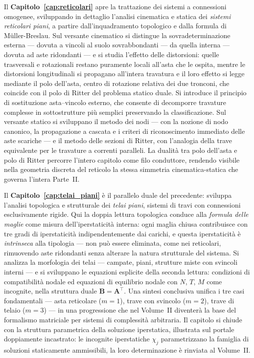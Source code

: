 Il \textbf{Capitolo~\ref{cap:reticolari}} apre la trattazione dei sistemi a connessioni
omogenee, sviluppando in dettaglio l'analisi cinematica e statica dei \emph{sistemi
	reticolari piani}, a partire dall'inquadramento topologico e dalla formula di
Müller-Breslau. Sul versante cinematico si distingue la sovradeterminazione esterna --- dovuta a vincoli al suolo
sovrabbondanti --- da quella interna --- dovuta ad aste ridondanti --- e si studia
l'effetto delle distorsioni: quelle trasversali e rotazionali restano puramente locali
all'asta che le ospita, mentre le distorsioni longitudinali si propagano all'intera
travatura e il loro effetto si legge mediante il polo dell'asta, centro di rotazione
relativa dei due tronconi, che coincide con il polo di Ritter del problema statico
duale. Si introduce il principio di sostituzione asta--vincolo esterno, che consente
di decomporre travature complesse in sottostrutture più semplici preservando la
classificazione. Sul versante statico si sviluppano il metodo dei nodi --- con la
nozione di nodo canonico, la propagazione a cascata e i criteri di riconoscimento
immediato delle aste scariche --- e il metodo delle sezioni di Ritter, con l'analogia
della trave equivalente per le travature a correnti paralleli. La dualità tra polo
dell'asta e polo di Ritter percorre l'intero capitolo come filo conduttore, rendendo
visibile nella geometria discreta del reticolo la stessa simmetria cinematica-statica
che governa l'intera Parte~II.

Il \textbf{Capitolo~\ref{cap:telai_piani}} è il parallelo duale del precedente:
sviluppa l'analisi topologica e strutturale dei \emph{telai piani}, sistemi di travi
con connessioni esclusivamente rigide. Qui la doppia lettura topologica conduce alla
\emph{formula delle maglie} come misura dell'iperstaticità interna: ogni maglia chiusa
contribuisce con tre gradi di iperstaticità indipendentemente dai carichi, e questa
iperstaticità è \emph{intrinseca} alla tipologia --- non può essere eliminata, come
nei reticolari, rimuovendo aste ridondanti senza alterare la natura strutturale del
sistema. Si analizza la morfologia dei telai --- campate, piani, strutture miste con
svincoli interni --- e si sviluppano le equazioni esplicite della seconda lettura:
condizioni di compatibilità nodale ed equazioni di equilibrio nodale con $N$, $T$,
$M$ come incognite, nella struttura duale $\bm{B} = \bm{A}^\top$. Una sintesi
conclusiva unifica i tre casi fondamentali --- asta reticolare ($m=1$), trave con
svincolo ($m=2$), trave di telaio ($m=3$) --- in una progressione che nel Volume~II
diventerà la base del formalismo matriciale per sistemi di complessità arbitraria.
Il capitolo si chiude con la struttura parametrica della soluzione iperstatica,
illustrata sul portale doppiamente incastrato: le incognite iperstatiche $\chi_j$
parametrizzano la famiglia di soluzioni staticamente ammissibili, la loro
determinazione è rinviata al Volume~II.

